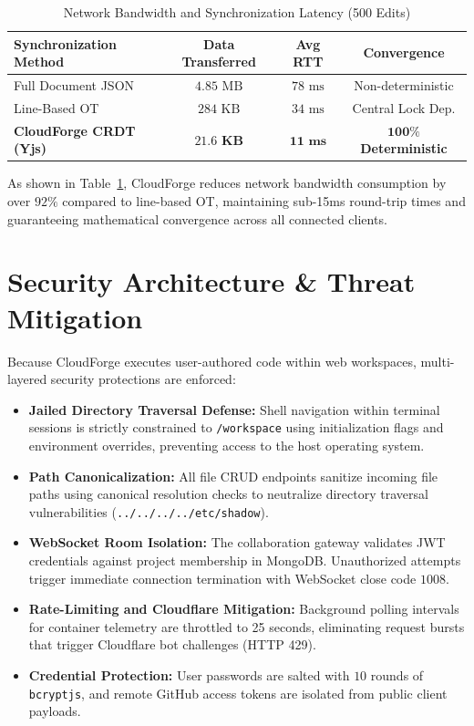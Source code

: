 \documentclass[conference]{IEEEtran}
\begin{document}
\begin{table}[htbp]
\centering
\caption{Network Bandwidth and Synchronization Latency (500 Edits)}
\label{tab:crdt_benchmark}
\begin{tabular}{@{}lccc@{}}
\toprule
\textbf{Synchronization Method} & \textbf{Data Transferred} & \textbf{Avg RTT} & \textbf{Convergence} \\
\midrule
Full Document JSON & $4.85\text{ MB}$ & $78\text{ ms}$ & Non-deterministic \\
Line-Based OT & $284\text{ KB}$ & $34\text{ ms}$ & Central Lock Dep. \\
\textbf{CloudForge CRDT (Yjs)} & $\mathbf{21.6\text{ KB}}$ & $\mathbf{11\text{ ms}}$ & $\mathbf{100\%}$ \textbf{Deterministic} \\
\bottomrule
\end{tabular}
\end{table}

As shown in Table~\ref{tab:crdt_benchmark}, CloudForge reduces network bandwidth consumption by over $92\%$ compared to line-based OT, maintaining sub-15ms round-trip times and guaranteeing mathematical convergence across all connected clients.

\section{Security Architecture \& Threat Mitigation}

Because CloudForge executes user-authored code within web workspaces, multi-layered security protections are enforced:

\begin{itemize}
    \item \textbf{Jailed Directory Traversal Defense:} Shell navigation within terminal sessions is strictly constrained to \texttt{/workspace} using initialization flags and environment overrides, preventing access to the host operating system.
    \item \textbf{Path Canonicalization:} All file CRUD endpoints sanitize incoming file paths using canonical resolution checks to neutralize directory traversal vulnerabilities (\texttt{../../../../etc/shadow}).
    \item \textbf{WebSocket Room Isolation:} The collaboration gateway validates JWT credentials against project membership in MongoDB. Unauthorized attempts trigger immediate connection termination with WebSocket close code $1008$.
    \item \textbf{Rate-Limiting and Cloudflare Mitigation:} Background polling intervals for container telemetry are throttled to 25 seconds, eliminating request bursts that trigger Cloudflare bot challenges (HTTP 429).
    \item \textbf{Credential Protection:} User passwords are salted with $10$ rounds of \texttt{bcryptjs}, and remote GitHub access tokens are isolated from public client payloads.
\end{itemize}
\end{document}
